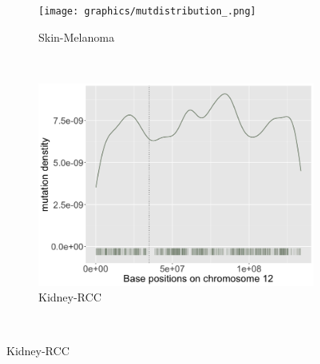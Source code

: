 \begin{figure}
    \begin{subfigure}{.5\textwidth}
    \texttt{[image: graphics/mutdistribution\_.png]}
    \caption{Skin-Melanoma}
    \label{fig:density_skin}
    \end{subfigure}
    ~
    \begin{subfigure}{.5\textwidth}
    
    \includegraphics[width=\linewidth,height=0.7\textwidth]{graphics/mutdistribution_Kidney-RCC.png}
    \caption{Kidney-RCC}
    \label{fig:density_kidney}
    \end{subfigure} \\
    \vspace{0.5cm}
    

\end{figure}
